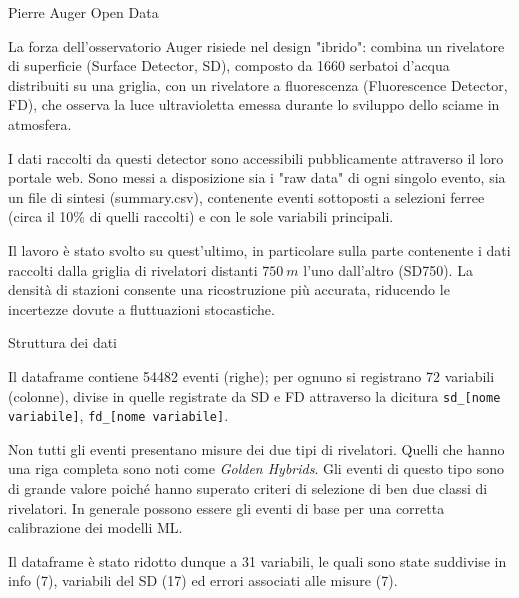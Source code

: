\documentclass[10pt]{beamer}
\begin{document}
\begin{frame}{Pierre Auger Open Data}

La forza dell'osservatorio Auger risiede nel design "ibrido": combina un rivelatore di superficie (Surface Detector, SD), composto da 1660 serbatoi d'acqua distribuiti su una griglia, con un rivelatore a fluorescenza (Fluorescence Detector, FD), che osserva la luce ultravioletta emessa durante lo sviluppo dello sciame in atmosfera. 
\bigskip

I dati raccolti da questi detector sono accessibili pubblicamente attraverso il loro portale web. Sono messi a disposizione sia i "raw data" di ogni singolo evento, sia un file di sintesi (summary.csv), contenente eventi sottoposti a selezioni ferree (circa il 10\% di quelli raccolti) e con le sole variabili principali.
\bigskip

Il lavoro è stato svolto su quest'ultimo, in particolare sulla parte contenente i dati raccolti dalla griglia di rivelatori distanti $750\ m$ l'uno dall'altro (SD750). La densità di stazioni consente una ricostruzione più accurata, riducendo le incertezze dovute a fluttuazioni stocastiche.
\end{frame}

\begin{frame}{Struttura dei dati}

Il dataframe contiene 54482 eventi (righe); per ognuno si registrano 72 variabili (colonne), divise in quelle registrate da SD e FD attraverso la dicitura \texttt{sd\_[nome variabile]}, \texttt{fd\_[nome variabile]}.
\bigskip

Non tutti gli eventi presentano misure dei due tipi di rivelatori. Quelli che hanno una riga completa sono noti come \emph{Golden Hybrids}.  Gli eventi di questo tipo sono di grande valore poiché hanno superato criteri di selezione di ben due classi di rivelatori. In generale possono essere gli eventi di base per una corretta calibrazione dei modelli ML.
\bigskip

Il dataframe è stato ridotto dunque a 31 variabili, le quali sono state suddivise in info (7), variabili del SD (17) ed errori associati alle misure (7). \\

\end{frame}
\end{document}

